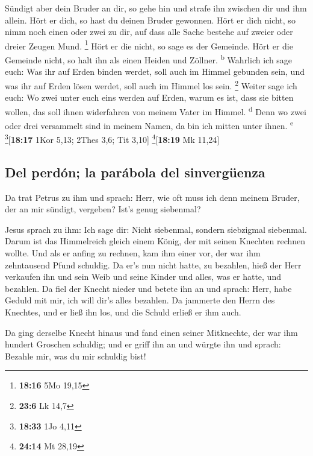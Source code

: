  Sündigt aber dein Bruder an dir, so gehe hin und strafe
ihn zwischen dir und ihm allein. Hört er dich, so hast du deinen Bruder
gewonnen.  Hört er dich nicht, so nimm noch einen oder
zwei zu dir, auf dass alle Sache bestehe auf zweier oder dreier Zeugen
Mund. \footnote{\textbf{18:16} 5Mo 19,15}  Hört er die
nicht, so sage es der Gemeinde. Hört er die Gemeinde nicht, so halt ihn
als einen Heiden und Zöllner. \textsuperscript{b} 
Wahrlich ich sage euch: Was ihr auf Erden binden werdet, soll auch im
Himmel gebunden sein, und was ihr auf Erden lösen werdet, soll auch im
Himmel los sein. \footnote{\textbf{23:6} Lk 14,7}  Weiter
sage ich euch: Wo zwei unter euch eins werden auf Erden, warum es ist,
dass sie bitten wollen, das soll ihnen widerfahren von meinem Vater im
Himmel. \textsuperscript{d}  Denn wo zwei oder drei
versammelt sind in meinem Namen, da bin ich mitten unter ihnen.
\textsuperscript{e} \footnote{\textbf{18:33} 1Jo 4,11}{[}\textbf{18:17}
1Kor 5,13; 2Thes 3,6; Tit 3,10{]} \footnote{\textbf{24:14} Mt 28,19}{[}\textbf{18:19}
Mk 11,24{]}

\hypertarget{del-perduxf3n-la-paruxe1bola-del-sinverguxfcenza}{%
\subsection{Del perdón; la parábola del
sinvergüenza}\label{del-perduxf3n-la-paruxe1bola-del-sinverguxfcenza}}

 Da trat Petrus zu ihm und sprach: Herr, wie oft muss ich
denn meinem Bruder, der an mir sündigt, vergeben? Ist's genug siebenmal?

 Jesus sprach zu ihm: Ich sage dir: Nicht siebenmal,
sondern siebzigmal siebenmal.  Darum ist das Himmelreich
gleich einem König, der mit seinen Knechten rechnen wollte.
 Und als er anfing zu rechnen, kam ihm einer vor, der war
ihm zehntausend Pfund schuldig.  Da er's nun nicht hatte,
zu bezahlen, hieß der Herr verkaufen ihn und sein Weib und seine Kinder
und alles, was er hatte, und bezahlen.  Da fiel der
Knecht nieder und betete ihn an und sprach: Herr, habe Geduld mit mir,
ich will dir's alles bezahlen.  Da jammerte den Herrn des
Knechtes, und er ließ ihn los, und die Schuld erließ er ihm auch.

 Da ging derselbe Knecht hinaus und fand einen seiner
Mitknechte, der war ihm hundert Groschen schuldig; und er griff ihn an
und würgte ihn und sprach: Bezahle mir, was du mir schuldig bist!

